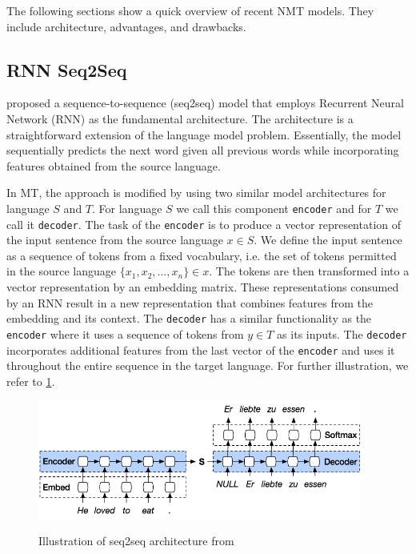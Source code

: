 The following sections show a quick overview of recent NMT models. They include architecture, advantages, and drawbacks.

\subsection{RNN Seq2Seq}
 proposed a sequence-to-sequence (seq2seq) model that employs Recurrent Neural Network (RNN) as the fundamental architecture. The architecture is a straightforward extension of the language model problem. Essentially, the model sequentially predicts the next word given all previous words while incorporating features obtained from the source language.

In MT, the approach is modified by using two similar model architectures for language $S$ and $T$. For language $S$ we call this component \texttt{encoder} and for $T$ we call it \texttt{decoder}.
The task of the \texttt{encoder} is to produce a vector representation of the input sentence from the source language $x \in S$. We define the input sentence as a sequence of tokens from a fixed vocabulary, i.e. the set of tokens permitted in the source language $\{x_1, x_2, ..., x_n\} \in x$. The tokens are then transformed into a vector representation by an embedding matrix. These representations consumed by an RNN result in a new representation that combines features from the embedding and its context. The \texttt{decoder} has a similar functionality as the \texttt{encoder} where it uses a sequence of tokens from $y \in T$ as its inputs. The \texttt{decoder} incorporates additional features from the last vector of the \texttt{encoder} and uses it throughout the entire sequence in the target language. For further illustration, we refer to \cref{img:rnnseq2seq}.

\begin{figure}[h]
    {\includegraphics[width=0.95\textwidth]{img/rnnseq2seq.png}}
    \centering
    \caption{Illustration of seq2seq architecture from }
    \label{img:rnnseq2seq}
\end{figure}

